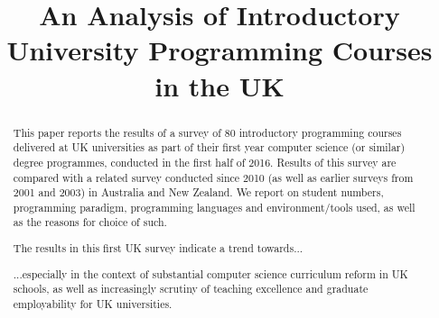\documentclass{sig-alternate}
\begin{document}
%

\title{An Analysis of Introductory University Programming Courses in the UK}
\iffalse
\numberofauthors{3}
\author{
\alignauthor
Ellen Murphy\\
\affaddr{Institute for\\Mathematical Innovation}\\
\affaddr{University of Bath}\\
\affaddr{e.murphy@bath.ac.uk}
\alignauthor
Tom Crick\\
\affaddr{Dept. of Computing}\\
\affaddr{Cardiff Metropolitan University}\\
\affaddr{tcrick@cardiffmet.ac.uk}
\alignauthor
James H. Davenport\\
\affaddr{Dept. of Computer Science}\\
\affaddr{University of Bath}\\
\affaddr{j.h.davenport@bath.ac.uk}\\
}
\fi
\maketitle

\begin{abstract}
This paper reports the results of a survey of 80 introductory
programming courses delivered at UK universities as part of their
first year computer science (or similar) degree programmes, conducted
in the first half of 2016. Results of this survey are compared with a
related survey conducted since 2010 (as well as earlier surveys from
2001 and 2003)  in Australia and New Zealand. %
We report on 
student numbers, programming paradigm, programming languages and
environment/tools used, as well as the reasons for choice of such.


The results in this first UK survey indicate a trend towards...

...especially in the context of substantial computer science
curriculum reform in UK schools, as well as increasingly scrutiny of
teaching excellence and graduate employability for UK universities.
\end{abstract}
\end{document}
